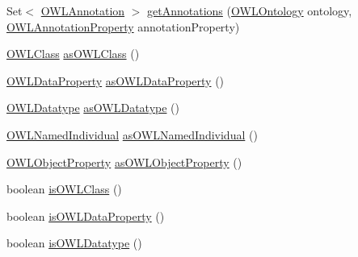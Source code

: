 \begin{DoxyCompactItemize}
\item 
Set$<$ \hyperlink{interfaceorg_1_1semanticweb_1_1owlapi_1_1model_1_1_o_w_l_annotation}{O\-W\-L\-Annotation} $>$ \hyperlink{classuk_1_1ac_1_1manchester_1_1cs_1_1owl_1_1owlapi_1_1_o_w_l_datatype_impl_a1a7776a446b87e52728ff699fe0cd7fa}{get\-Annotations} (\hyperlink{interfaceorg_1_1semanticweb_1_1owlapi_1_1model_1_1_o_w_l_ontology}{O\-W\-L\-Ontology} ontology, \hyperlink{interfaceorg_1_1semanticweb_1_1owlapi_1_1model_1_1_o_w_l_annotation_property}{O\-W\-L\-Annotation\-Property} annotation\-Property)
\item 
\hyperlink{interfaceorg_1_1semanticweb_1_1owlapi_1_1model_1_1_o_w_l_class}{O\-W\-L\-Class} \hyperlink{classuk_1_1ac_1_1manchester_1_1cs_1_1owl_1_1owlapi_1_1_o_w_l_datatype_impl_a90544b14de150d3f98d0638c29b4644b}{as\-O\-W\-L\-Class} ()
\item 
\hyperlink{interfaceorg_1_1semanticweb_1_1owlapi_1_1model_1_1_o_w_l_data_property}{O\-W\-L\-Data\-Property} \hyperlink{classuk_1_1ac_1_1manchester_1_1cs_1_1owl_1_1owlapi_1_1_o_w_l_datatype_impl_ab785c1fa3bddb860c53143c2af029b1a}{as\-O\-W\-L\-Data\-Property} ()
\item 
\hyperlink{interfaceorg_1_1semanticweb_1_1owlapi_1_1model_1_1_o_w_l_datatype}{O\-W\-L\-Datatype} \hyperlink{classuk_1_1ac_1_1manchester_1_1cs_1_1owl_1_1owlapi_1_1_o_w_l_datatype_impl_a3af548068e3b26eb0cf030aa2c3f8502}{as\-O\-W\-L\-Datatype} ()
\item 
\hyperlink{interfaceorg_1_1semanticweb_1_1owlapi_1_1model_1_1_o_w_l_named_individual}{O\-W\-L\-Named\-Individual} \hyperlink{classuk_1_1ac_1_1manchester_1_1cs_1_1owl_1_1owlapi_1_1_o_w_l_datatype_impl_ab837a558fff5a3865832fa915aaf5001}{as\-O\-W\-L\-Named\-Individual} ()
\item 
\hyperlink{interfaceorg_1_1semanticweb_1_1owlapi_1_1model_1_1_o_w_l_object_property}{O\-W\-L\-Object\-Property} \hyperlink{classuk_1_1ac_1_1manchester_1_1cs_1_1owl_1_1owlapi_1_1_o_w_l_datatype_impl_afc1a42935a1dc69ebdbe67e045f819f5}{as\-O\-W\-L\-Object\-Property} ()
\item 
boolean \hyperlink{classuk_1_1ac_1_1manchester_1_1cs_1_1owl_1_1owlapi_1_1_o_w_l_datatype_impl_a980600cf87a9ed9dab7d3b333ff460b9}{is\-O\-W\-L\-Class} ()
\item 
boolean \hyperlink{classuk_1_1ac_1_1manchester_1_1cs_1_1owl_1_1owlapi_1_1_o_w_l_datatype_impl_a20511dfbfb7a09a072f275680c0ff170}{is\-O\-W\-L\-Data\-Property} ()
\item 
boolean \hyperlink{classuk_1_1ac_1_1manchester_1_1cs_1_1owl_1_1owlapi_1_1_o_w_l_datatype_impl_ac79d0e5a4b6d2453cfbaa00867ae39ac}{is\-O\-W\-L\-Datatype} ()

\end{DoxyCompactItemize}
